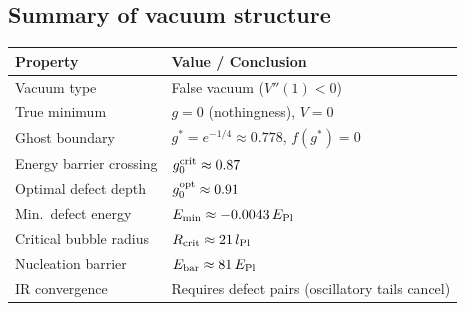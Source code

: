 \subsection{Summary of vacuum structure}

\begin{center}
\begin{tabular}{ll}
\hline
Property & Value / Conclusion \\
\hline
Vacuum type & False vacuum ($V''(1)<0$) \\
True minimum & $g=0$ (nothingness), $V=0$ \\
Ghost boundary & $g^*=e^{-1/4}\approx0.778$, $f(g^*)=0$ \\
Energy barrier crossing & $g_0^{\rm crit}\approx0.87$ \\
Optimal defect depth & $g_0^{\rm opt}\approx0.91$ \\
Min.\ defect energy & $E_{\rm min}\approx-0.0043\,E_{\rm Pl}$ \\
Critical bubble radius & $R_{\rm crit}\approx21\,l_{\rm Pl}$ \\
Nucleation barrier & $E_{\rm bar}\approx81\,E_{\rm Pl}$ \\
IR convergence & Requires defect pairs (oscillatory tails cancel) \\
\hline
\end{tabular}
\end{center}
